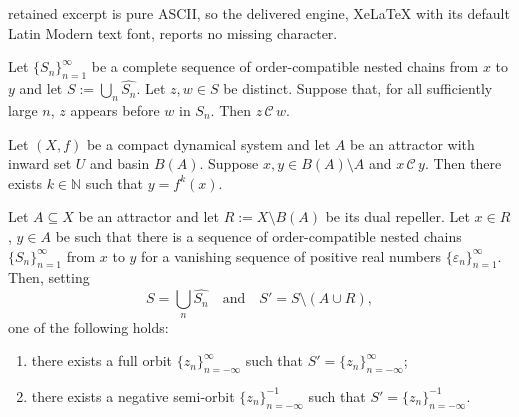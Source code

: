 \documentclass[10pt,a4paper]{amsart}
\begin{document}
retained excerpt is pure ASCII, so the delivered engine, XeLaTeX with its default Latin Modern text font, reports no missing character.
\begin{lem}\label{lem:ONC-implies-chain}
Let $\{S_n\}_{n=1}^{\infty}$ be a complete sequence of order-compatible nested chains from $x$ to $y$
and let $S:=\bigcup_n \widehat{S_n}$. Let $z,w\in S$ be
distinct. Suppose that, for all sufficiently large $n$, $z$ appears
before $w$ in $S_n$. Then $z\,\mathcal{C}\,w$.
\end{lem}

\begin{thm}\label{prop:gradient-like-orbit}
    Let $(X,f)$ be a compact dynamical system and let $A$ be an attractor with 
    inward set $U$ and basin $B(A)$. Suppose $x,y\in B(A)\setminus A$ and 
    $x\,\mathcal{C}\,y$. Then there exists $k\in\mathbb{N}$ such that 
    $y=f^k(x)$.
\end{thm}

\begin{lem}\label{lem:nested-contained-in-orbit}
    Let $A\subseteq X$ be an attractor and let $R:=X\setminus B(A)$ be its dual repeller. Let $x\in R$, $y\in A$ be such that there is a sequence of order-compatible nested chains $\{S_n\}_{n=1}^{\infty}$ from $x$ to $y$ for a vanishing sequence of positive real numbers $\{\varepsilon_n\}_{n=1}^\infty$. Then, setting
    $$S=\bigcup_n \widehat{S_n}\quad\text{and}\quad S'=S\setminus(A\cup R),$$
    one of the following holds:
\begin{enumerate}
    \item there exists a full orbit $\{z_n\}_{n=-\infty}^\infty$ such that $S'=\{z_n\}_{n=-\infty}^\infty$;
    \item there exists a negative semi-orbit $\{z_n\}_{n=-\infty}^{-1}$ such that $S'=\{z_n\}_{n=-\infty}^{-1}.$
\end{enumerate}  
\end{lem}
\end{document}
